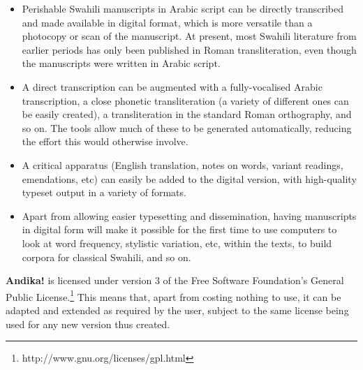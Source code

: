 \begin{itemize}
\item Perishable Swahili manuscripts in Arabic script can be directly transcribed and made available in digital format, which is more versatile than a photocopy or scan of the manuscript. At present, most Swahili literature from earlier periods has only been published in Roman transliteration, even though the manuscripts were written in Arabic script.

\item A direct transcription can be augmented with a fully-vocalised Arabic transcription, a close phonetic transliteration (a variety of different ones can be easily created), a transliteration in the standard Roman orthography, and so on. The tools allow much of these to be generated automatically, reducing the effort this would otherwise involve.

\item A critical apparatus (English translation, notes on words, variant readings, emendations, etc) can easily be added to the digital version, with high-quality typeset output in a variety of formats.

\item Apart from allowing easier typesetting and dissemination, having manuscripts in digital form will make it possible for the first time to use computers to look at word frequency, stylistic variation, etc, within the texts, to build corpora for classical Swahili, and so on.
\end{itemize}

\textbf{Andika!} is licensed under version 3 of the Free Software Foundation's General Public License.\footnote{http://www.gnu.org/licenses/gpl.html}  This means that, apart from costing nothing to use, it can be adapted and extended as required by the user, subject to the same license being used for any new version thus created.

